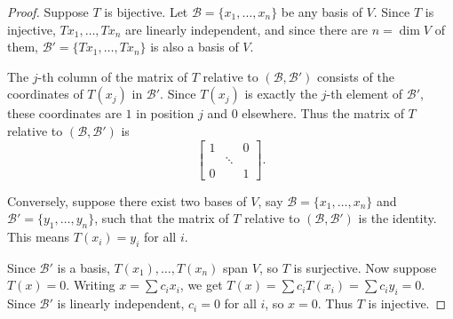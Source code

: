 \begin{proof}
    Suppose $T$ is bijective. Let $\mathcal{B} = \{x_1, \ldots, x_n\}$ be any basis of $V$.
    Since $T$ is injective, $Tx_1, \ldots, Tx_n$ are linearly independent, and since
    there are $n = \dim V$ of them, $\mathcal{B}' = \{Tx_1, \ldots, Tx_n\}$ is also a basis of $V$.

    The $j$-th column of the matrix of $T$ relative to $(\mathcal{B}, \mathcal{B}')$
    consists of the coordinates of $T(x_j)$ in $\mathcal{B}'$. Since $T(x_j)$ is
    exactly the $j$-th element of $\mathcal{B}'$, these coordinates are $1$ in
    position $j$ and $0$ elsewhere. Thus the matrix of $T$ relative to $(\mathcal{B}, \mathcal{B}')$ is
    \[
    \begin{bmatrix} 1 & & 0 \\ & \ddots & \\ 0 & & 1 \end{bmatrix}.
    \]

    Conversely, suppose there exist two bases of $V$, say
    $\mathcal{B} = \{x_1, \ldots, x_n\}$ and $\mathcal{B}' = \{y_1, \ldots, y_n\}$,
    such that the matrix of $T$ relative to $(\mathcal{B}, \mathcal{B}')$ is the identity.
    This means $T(x_i) = y_i$ for all $i$.

    Since $\mathcal{B}'$ is a basis, $T(x_1), \ldots, T(x_n)$ span $V$, so $T$ is surjective.
    Now suppose $T(x) = 0$. Writing $x = \sum c_i x_i$, we get
    $T(x) = \sum c_i T(x_i) = \sum c_i y_i = 0$.
    Since $\mathcal{B}'$ is linearly independent, $c_i = 0$ for all $i$, so $x = 0$.
    Thus $T$ is injective.
\end{proof}

